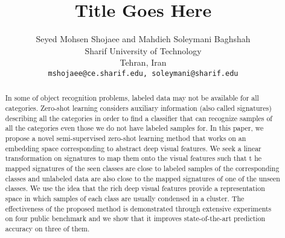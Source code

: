 \documentclass[10pt,twocolumn,letterpaper]{article}
\begin{document}
\title{Title Goes Here}
 \author{Seyed Mohsen Shojaee and Mahdieh Soleymani Baghshah\\
 Sharif University of Technology \\
 Tehran, Iran\\
 {\tt\small mshojaee@ce.sharif.edu, soleymani@sharif.edu}
 }

\maketitle

\begin{abstract}
In some of object recognition problems, labeled data may not be available for all categories.
 Zero-shot learning considers auxiliary information (also called signatures)
 describing all the categories in order to find a classifier that can recognize samples of all the categories
 even those we do not have labeled samples for. %
In this paper, we propose a novel semi-supervised zero-shot learning method that works on an embedding space corresponding to
abstract deep visual features. We seek a linear transformation on signatures to map them onto the visual features such that t
he mapped signatures of the seen classes are close to labeled samples of the corresponding
classes and unlabeled data are also close to the mapped signatures of one of the unseen classes.
 We use the idea that the rich deep visual features provide a representation
 space in which samples of each class are usually condensed in a cluster. The effectiveness of the proposed method is demonstrated through extensive
experiments on four public benchmark and we show that it improves state-of-the-art prediction accuracy on three of them.
\end{abstract}
\end{document}
